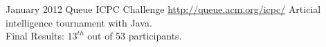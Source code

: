 \documentclass[11pt,a4paper]{moderncv}
\begin{document}
\cventry
{January 2012}
{Queue ICPC Challenge}
{}
{\url{http://queue.acm.org/icpc/}}
{}
{Articial intelligence tournament with Java.\\Final Results: $13^{th}$ out of 53 participants.}

\renewcommand{\listitemsymbol}{-} %


\nocite{*}

\end{document}
